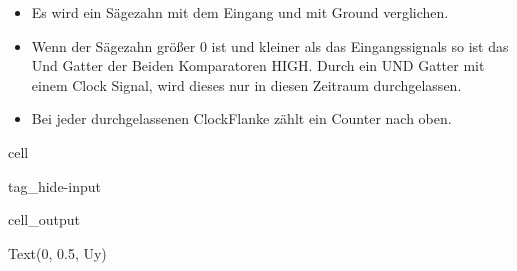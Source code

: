 \documentclass[letterpaper,10pt,english]{jupyterBook}
\begin{document}
\begin{DUlineblock}{0em}
\item[] 
\end{DUlineblock}
\begin{itemize}
\item {} 
\sphinxAtStartPar
Es wird ein Sägezahn mit dem Eingang und mit Ground verglichen.

\item {} 
\sphinxAtStartPar
Wenn der Sägezahn größer 0 ist und kleiner als das Eingangssignals
so ist das Und Gatter der Beiden Komparatoren HIGH.
Durch ein UND Gatter mit einem Clock Signal,
wird dieses nur in diesen Zeitraum durchgelassen.

\item {} 
\sphinxAtStartPar
Bei jeder durchgelassenen Clock\sphinxhyphen{}Flanke zählt ein Counter nach oben.

\end{itemize}

\begin{DUlineblock}{0em}
\item[] 
\end{DUlineblock}

\begin{sphinxuseclass}{cell}
\begin{sphinxuseclass}{tag_hide-input}\begin{sphinxVerbatimOutput}

\begin{sphinxuseclass}{cell_output}
\begin{sphinxVerbatim}[commandchars=\\\{\}]
Text(0, 0.5, \PYGZsq{}\PYGZdl{}U\PYGZus{}y\PYGZdl{}\PYGZsq{})
\end{sphinxVerbatim}

\noindent{}

\end{sphinxuseclass}\end{sphinxVerbatimOutput}

\end{sphinxuseclass}
\end{sphinxuseclass}
\begin{DUlineblock}{0em}
\item[] 
\end{DUlineblock}
\end{document}
